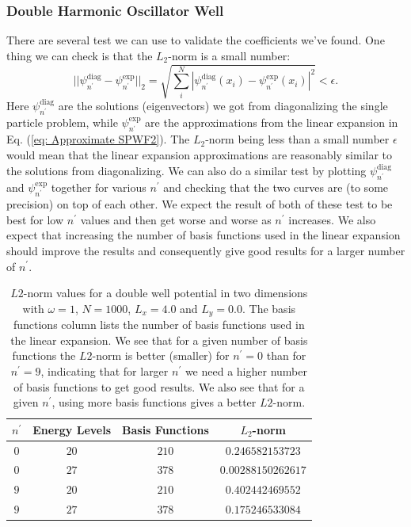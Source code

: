 \documentclass[../main.tex]{subfiles}
\begin{document}
\subsubsection{Double Harmonic Oscillator Well}
There are several test we can use to validate the coefficients we've found. One thing we can check is that the $L_2$-norm is a small number:
\begin{equation}
    ||\psi_{n^\prime}^\textrm{diag}-\psi_{n^\prime}^\textrm{exp}||_2 = \sqrt{\sum_i^N |\psi_{n^\prime}^\textrm{diag}(x_i)-\psi_{n^\prime}^\textrm{exp}(x_i)|^2} < \epsilon.
\end{equation}
Here $\psi_{n^\prime}^\textrm{diag}$ are the solutions (eigenvectors) we got from diagonalizing the single particle problem, while $\psi_{n^\prime}^\textrm{exp}$ are the approximations from the linear expansion in Eq. (\ref{eq: Approximate SPWF2}). The $L_2$-norm being less than a small number $\epsilon$ would mean that the linear expansion approximations are reasonably similar to the solutions from diagonalizing. We can also do a similar test by plotting $\psi_{n^\prime}^\textrm{diag}$ and $\psi_{n^\prime}^\textrm{exp}$ together for various $n^\prime$ and checking that the two curves are (to some precision) on top of each other. We expect the result of both of these test to be best for low $n^\prime$ values and then get worse and worse as $n^\prime$ increases. We also expect that increasing the number of basis functions used in the linear expansion should improve the results and consequently give good results for a larger number of $n^\prime$.

\begin{table}[!ht]
  \centering
  \begin{tabular}{ | c | c | c | c | }
    \hline
    $n^\prime$ & Energy Levels & Basis Functions & $L_2$-norm\\*
    \hline
    $0$ & $20$ & $210$ & $0.246582153723$ %
    \\*
    \hline
    $0$ & $27$ & $378$ & $0.00288150262617$ %
    \\*
    \hline
    $9$ & $20$ & $210$ & $0.402442469552$ %
    \\*
    \hline
    $9$ & $27$ & $378$ & $0.175246533084$ %
    \\*
    \hline
  \end{tabular}
  \caption{$L2$-norm values for a double well potential in two dimensions with $\omega = 1$, $N = 1000$, $L_x = 4.0$ and $L_y = 0.0$. The basis functions column lists the number of basis functions used in the linear expansion. We see that for a given number of basis functions the $L2$-norm is better (smaller) for $n^\prime = 0$ than for $n^\prime = 9$, indicating that for larger $n^\prime$ we need a higher number of basis functions to get good results. We also see that for a given $n^\prime$, using more basis functions gives a better $L2$-norm.}
  \label{tab:L2-norm}
\end{table}
\end{document}
